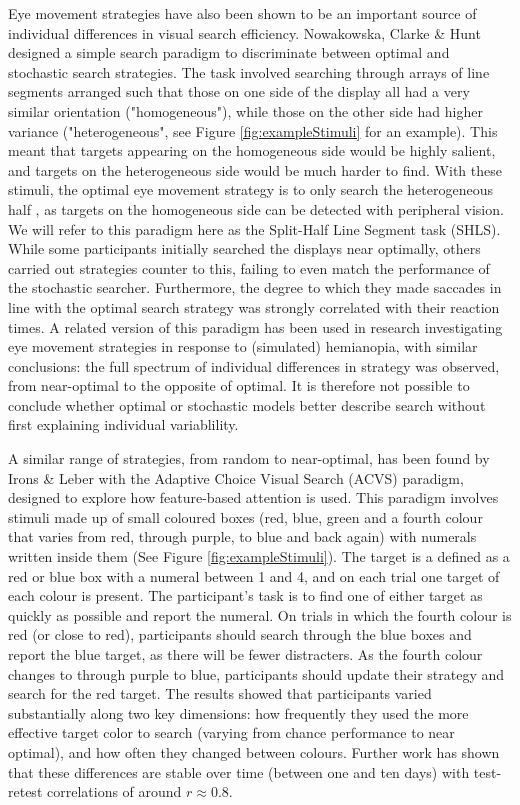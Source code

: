 \documentclass[]{rsos}%
\begin{document}
Eye movement strategies have also been shown to be an important source of individual differences in visual search efficiency. Nowakowska, Clarke \& Hunt\cite{nowakowska2017} designed a simple search paradigm to discriminate between optimal\cite{najemnik-geisler2008} and stochastic \cite{clarke2016} search strategies. The task involved searching through arrays of line segments arranged such that those on one side of the display all had a very similar orientation ("homogeneous"), while those on the other side had higher variance ("heterogeneous", see Figure \ref{fig:exampleStimuli} for an example). This meant that targets appearing on the homogeneous side would be highly salient, and targets on the heterogeneous side  would be much harder to find. With these stimuli, the optimal eye movement strategy is to only search the heterogeneous half , as targets on the homogeneous side can be detected with peripheral vision. We will refer to this paradigm here as the Split-Half Line Segment task (SHLS). While some participants initially searched the displays near optimally, others carried out strategies counter to this, failing to even match the performance of the stochastic searcher. Furthermore, the degree to which they made saccades in line with the optimal search strategy was strongly correlated with their reaction times. A related version of this paradigm has been used in research investigating eye movement strategies in response to (simulated) hemianopia\cite{nowakowska2016,nowakowska2018}, with similar conclusions: the full spectrum of individual differences in strategy was observed, from near-optimal to the opposite of optimal. It is therefore not possible to conclude whether optimal or stochastic models better describe search without first explaining individual variablility.

A similar range of strategies, from random to near-optimal, has been found by Irons \& Leber with the Adaptive Choice Visual Search (ACVS) paradigm\cite{irons-leber2016}, designed to explore how feature-based attention is used. This paradigm involves stimuli made up of small coloured boxes (red, blue, green and a fourth colour that varies from red, through purple, to blue and back again) with numerals written inside them (See Figure \ref{fig:exampleStimuli}). The target is a defined as a red or blue box with a numeral between 1 and 4, and on each trial one target of each colour is present. The participant's task is to find one of either target as quickly as possible and report the numeral. On trials in which the fourth colour is red (or close to red), participants should search through the blue boxes and report the blue target, as there will be fewer distracters. As the fourth colour changes to through purple to blue, participants should update their strategy and search for the red target. The results showed that participants varied substantially along two key dimensions: how frequently they used the more effective target color to search (varying from chance performance to near optimal), and how often they changed between colours. Further work has shown that these differences are stable over time (between one and ten days) with test-retest correlations of around $r \approx 0.8$\cite{irons-leber2018}.
\end{document}
